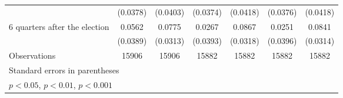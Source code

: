 \begin{table}[htbp]
\begin{tabular}{l*{6}{c}}
                    &    (0.0378)         &    (0.0403)         &    (0.0374)         &    (0.0418)         &    (0.0376)         &    (0.0418)         \\
[1em]
 6 quarters after the election&      0.0562         &      0.0775\sym{*}  &      0.0267         &      0.0867\sym{**} &      0.0251         &      0.0841\sym{**} \\
                    &    (0.0389)         &    (0.0313)         &    (0.0393)         &    (0.0318)         &    (0.0396)         &    (0.0314)         \\
\hline
Observations        &       15906         &       15906         &       15882         &       15882         &       15882         &       15882         \\
\hline\hline
\multicolumn{7}{l}{\footnotesize Standard errors in parentheses}\\
\multicolumn{7}{l}{\footnotesize \sym{*} \(p<0.05\), \sym{**} \(p<0.01\), \sym{***} \(p<0.001\)}\\
\end{tabular}
\end{table}

